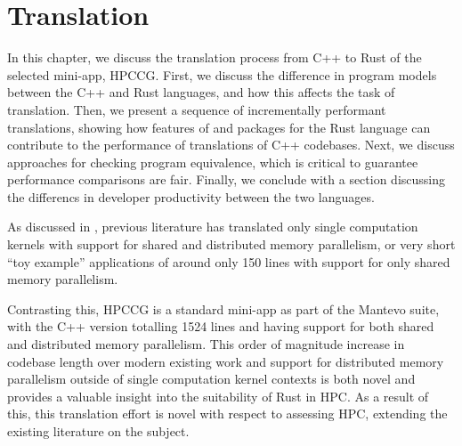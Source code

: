 \chapter{Translation}
\label{ch:translation}


In this chapter, we discuss the translation process from C++ to Rust of the selected \acrshort{mini-app}, \acrshort{HPCCG}.
First, we discuss the difference in program models between the C++ and Rust languages, and how this affects the task of translation.
Then, we present a sequence of incrementally performant translations, showing how features of and packages for the Rust language can contribute to the performance of translations of C++ codebases. Next, we discuss approaches for checking program equivalence, which is critical to guarantee performance comparisons are fair. Finally, we conclude with a section discussing the differencs in developer productivity between the two languages.


As discussed in , previous literature has translated only single computation kernels \cite{bychkovRustLanguageSupercomputing2021} with support for shared and distributed memory parallelism, or very short ``toy example'' applications of around only 150 lines \cite{costanzoPerformanceVsProgramming2021} \cite{moranEmergingTechnologiesRust2023} with support for only shared memory parallelism.

Contrasting this, \acrshort{HPCCG} is a standard \acrshort{mini-app} as part of the Mantevo suite, with the C++ version totalling 1524 lines and having support for both shared and distributed memory parallelism. This order of magnitude increase in codebase length over modern existing work and support for distributed memory parallelism outside of single computation kernel contexts is both novel and provides a valuable insight into the suitability of Rust in \acrshort{HPC}. As a result of this, this translation effort is novel with respect to assessing \acrshort{HPC}, extending the existing literature on the subject.

